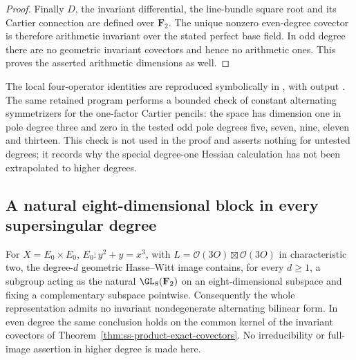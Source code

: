 \begin{proof}
Finally $D$, the invariant differential, the line-bundle square root
and its Cartier connection are defined over $\mathbf F_2$.
The unique nonzero even-degree covector is therefore arithmetic
invariant over the stated perfect base field. In odd degree there
are no geometric invariant covectors and hence no arithmetic ones.
This proves the asserted arithmetic dimensions as well.
\end{proof}

\begin{remark}\label{auto:A_monodromy:9cc9a63fa2c6}

The local four-operator identities are reproduced symbolically in
,
with output
.
The same retained program performs a bounded check of constant
alternating symmetrizers for the one-factor Cartier pencils: the
space has dimension one in pole degree three and zero in the tested
odd pole degrees five, seven, nine, eleven and thirteen. This check
is not used in the proof and asserts nothing for untested degrees;
it records why the special degree-one Hessian calculation has not
been extrapolated to higher degrees.
\end{remark}


\subsection{A natural eight-dimensional block in every supersingular degree}
\label{subsec:ss-uniform-GL8-block}

\begin{theorem}\label{thm:ss-uniform-GL8-block}
For $X=E_0\times E_0$, $E_0:y^2+y=x^3$, with
$L=\mathcal O(3O)\boxtimes\mathcal O(3O)$ in characteristic two,
the degree-$d$ geometric Hasse--Witt image contains, for every $d\ge1$,
a subgroup acting as the natural $\GL_8(\mathbf F_2)$ on an
eight-dimensional subspace and fixing a complementary subspace pointwise.
Consequently the whole representation admits no invariant nondegenerate
alternating bilinear form. In even degree the same conclusion holds on
the common kernel of the invariant covectors of
Theorem~\ref{thm:ss-product-exact-covectors}.
No irreducibility or full-image assertion in higher degree is made here.
\end{theorem}

